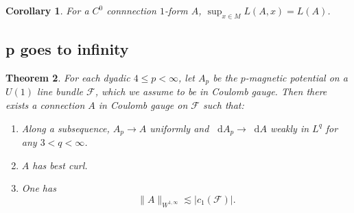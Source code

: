 \documentclass[reqno,11pt]{amsart}
\newcommand*\dif{\mathop{}\!\mathrm{d}}
\newtheorem{theorem}{Theorem}[section]
\newtheorem{corollary}[theorem]{Corollary}
\theoremstyle{definition}
\numberwithin{equation}{section}
\begin{document}
\begin{corollary}\label{local curl mod gives global}
For a $C^0$ connnection $1$-form $A$, $\sup_{x \in M} L(A, x) = L(A)$.
\end{corollary}

\subsection{p goes to infinity}
\begin{theorem}\label{existence infinity}
For each dyadic $4 \leq p < \infty$, let $A_p$ be the $p$-magnetic potential on a $U(1)$ line bundle $\mathscr F$, which we assume to be in Coulomb gauge.
Then there exists a connection $A$ in Coulomb gauge on $\mathscr F$ such that:
\begin{enumerate}
\item Along a subsequence, $A_p \to A$ uniformly and $\dif A_p \to \dif A$ weakly in $L^q$ for any $3 < q < \infty$.
\item $A$ has best curl.
\item One has 
\begin{equation}\label{Sobolev bounds for infinity}
	\|A\|_{W^{1, \infty}} \lesssim |c_1(\mathscr F)|.
\end{equation}
\end{enumerate}
\end{theorem}
\end{document}
